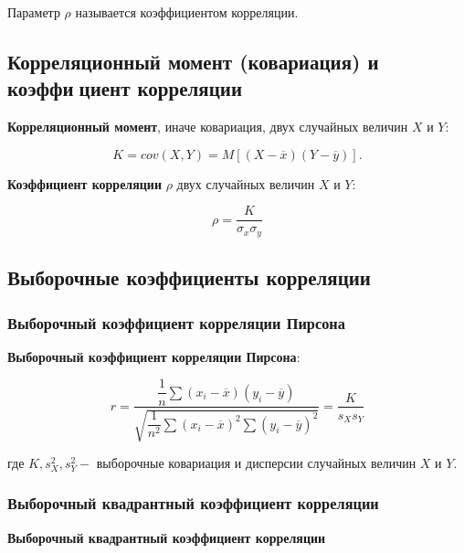 \documentclass[a4paper]{article}
\begin{document}
        Параметр $\rho$ называется коэффициентом корреляции.
    
    \subsection{Корреляционный момент (ковариация) и коэффициент корреляции}
    
        \textbf{Корреляционный момент}, иначе ковариация, двух случайных величин $X$ и $Y$:
        
        \begin{equation}\label{cov}
            K = cov(X, Y) = M[(X - \overline{x})(Y - \overline{y})].
        \end{equation}
        
        \textbf{Коэффициент корреляции} $\rho$ двух случайных величин $X$ и $Y$:
        
        \begin{equation}\label{cor}
            \rho = \dfrac{K}{\sigma_x \sigma_y}
        \end{equation}
    
    \subsection{Выборочные коэффициенты корреляции}
    
        \subsubsection{Выборочный коэффициент корреляции Пирсона}
            \textbf{Выборочный коэффициент корреляции Пирсона}:
            
            \begin{equation}\label{pearson}
                r = \dfrac{\dfrac{1}{n} \sum(x_i - \overline{x})(y_i - \overline{y})}{\sqrt{\dfrac{1}{n^2} \sum(x_i - \overline{x})^2 \sum(y_i - \overline{y})^2}} = \dfrac{K}{s_X s_Y}
            \end{equation}
            
            где $K, s^2_X, s^2_Y -$ выборочные ковариация и дисперсии случайных величин $X$ и $Y$.
            
        \subsubsection{Выборочный квадрантный коэффициент корреляции}
        
        \textbf{Выборочный квадрантный коэффициент корреляции}
        
\end{document}
